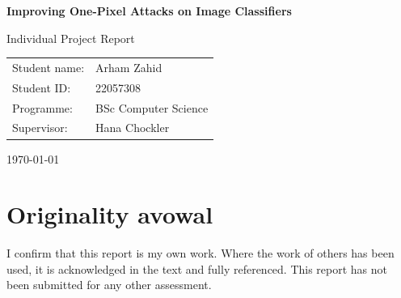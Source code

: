 \documentclass[11pt,a4paper]{article}
\begin{document}
\hypersetup{pageanchor=false}
\thispagestyle{empty}
\begin{center}
\vspace*{2cm}
{\LARGE \textbf{Improving One-Pixel Attacks on Image Classifiers}\par}
\vspace{1.5cm}

{\large Individual Project Report\par}
\vspace{1.5cm}

\begin{tabular}{@{}ll@{}}
Student name: & Arham Zahid \\
Student ID: & 22057308 \\
Programme: & BSc Computer Science \\
Supervisor: & Hana Chockler \\
\end{tabular}

\vfill
{\large \today\par}
\end{center}
\clearpage
\hypersetup{pageanchor=true}

\setcounter{page}{1}

\section*{Originality avowal}
I confirm that this report is my own work. Where the work of others has been used, it is acknowledged in the text and fully referenced. This report has not been submitted for any other assessment.

\clearpage
\end{document}
